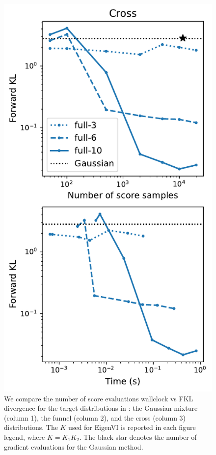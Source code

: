 \begin{figure}[t]
    \includegraphics[scale=0.42]{figs/expts-2d/metrics-cross_full.pdf}
    \caption{We compare the number of score evaluations wallclock vs
FKL divergence for the target distributions in
: the Gaussian mixture (column 1),
the funnel (column 2), and
the cross (column 3) distributions.
The $K$ used for EigenVI is reported in each figure legend,
where $K=K_1 K_2$.
The black star denotes the number of gradient evaluations for the Gaussian method.
    }
\label{fig:2dtargets-metrics}
\end{figure}

